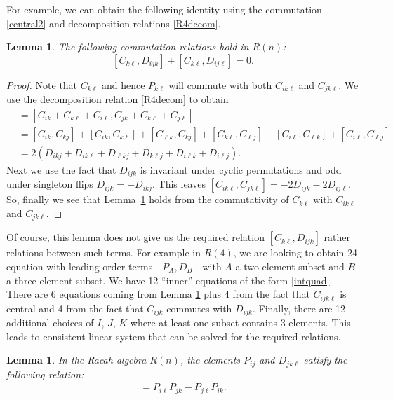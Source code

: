 \documentclass[10pt,a4paper]{amsart}
\numberwithin{equation}{section}
\newtheorem{Lemma}[Theorem]{Lemma}
\begin{document}
For example, we can obtain the following identity using the commutation \eqref{central2} and decomposition relations \eqref{R4decom}.
\begin{Lemma}\label{PDcomm}
The following commutation relations hold in $R(n)$:
\[
  [C_{k\ell}, D_{ijk}] +[C_{k\ell} ,D_{ij\ell}]=0.
  \]
\end{Lemma}
\begin{proof}
 Note that $C_{k\ell}$ and hence $P_{k\ell}$ will commute with both $C_{ik\ell}$ and $C_{jk\ell}$. We use the decomposition relation \eqref{R4decom} to obtain
\begin{align*}
[C_{ik\ell}, C_{jk\ell}]&= [C_{ik}+C_{k\ell}+C_{i\ell}, C_{jk} +C_{k\ell}+C_{j\ell}]\\
&= [C_{ik},C_{kj}]+[C_{ik}, C_{k\ell}] + [C_{\ell k}, C_{kj}] + [C_{k\ell}, C_{\ell j}] + [C_{i\ell}, C_{\ell k} ]+[C_{i \ell}, C_{\ell j}]\\
&= 2 ( D_{ikj} + D_{ik\ell} +D_{\ell k j} + D_{k\ell j} +D_{i\ell k} +D_{i\ell j} ).
\end{align*}
Next we use the fact that $D_{ijk}$ is invariant under cyclic permutations and odd under singleton flips $D_{ijk}=-D_{ikj}$. This leaves
$
[C_{ik\ell}, C_{jk\ell}]=-2D_{ijk} -2D_{ij\ell}$.
So, finally we see that Lemma~\ref{PDcomm} holds from the commutativity of $C_{k\ell}$ with $C_{ik\ell}$ and $C_{jk\ell}$.
\end{proof}

Of course, this lemma does not give us the required relation $[C_{k\ell}, D_{ijk}]$ rather relations between such terms. For example in $R(4)$, we are looking to obtain 24 equation with leading order terms $[P_{A}, D_{B}]$ with $A$ a two element subset and $B$ a three element subset. We have 12 ``inner'' equations of the form \eqref{intquad}. There are 6 equations coming from Lemma \ref{PDcomm} plus 4 from the fact that $C_{ijk\ell}$ is central and 4 from the fact that $C_{ijk}$ commutes with $D_{ijk}$. Finally, there are 12 additional choices of $I$, $J$, $K$ where at least one subset contains 3 elements. This leads to consistent linear system that can be solved for the required relations.

\begin{Lemma}\label{outerlemma}
In the Racah algebra $R(n)$, the elements $P_{ij}$ and $D_{jk\ell}$ satisfy the following relation:
\begin{gather}
[P_{ij}, D_{jk\ell}] =P_{i\ell}P_{jk}-P_{j\ell}P_{ik} .\label{outter}
\end{gather}
\end{Lemma}
\end{document}
